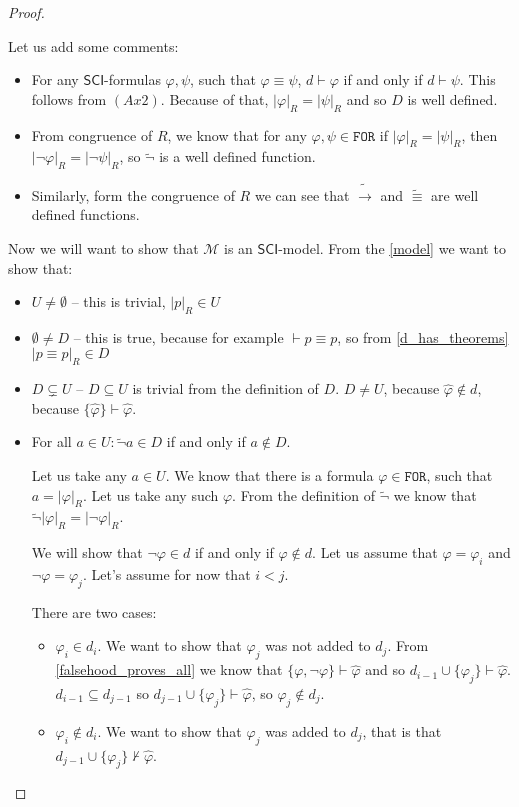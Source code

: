 \documentclass{article}
\theoremstyle{definition}
\theoremstyle{definition}
\theoremstyle{definition}
\theoremstyle{definition}
\theoremstyle{definition}
\newcommand*{\id}{\equiv}
\newcommand*{\ra}{\rightarrow}
\newcommand*{\FOR}{\texttt{FOR}}
\newcommand{\SCI}{$\mathsf{SCI}$\xspace}
\begin{document}
\begin{proof}
\begin{itemize}
    \end{itemize}
    Let us add some comments:
    \begin{itemize}
        \item For any \SCI-formulas $\varphi, \psi$, such that $\varphi \id \psi$, $d \vdash
                  \varphi$ if and only if $d \vdash \psi$. This follows from $(Ax2)$. Because of
              that, $|\varphi|_R = |\psi|_R$ and so $D$ is well defined.
        \item From congruence of $R$, we know that for any $\varphi, \psi \in \FOR$ if
              $|\varphi|_R = |\psi|_R$, then $|\lnot \varphi|_R = |\lnot \psi|_R$, so
              $\tilde{\lnot}$ is a well defined function.
        \item Similarly, form the congruence of $R$ we can see that $\tilde{\ra}$ and
              $\tilde{\id}$ are well defined functions.
    \end{itemize}
    Now we will want to show that $\mathcal{M}$ is an \SCI-model. From the
    \cref{model} we want to show that:
    \begin{itemize}
        \item $U \not = \emptyset$ -- this is trivial, $|p|_R \in U$
        \item $\emptyset \not = D$ -- this is true, because for example $\vdash p \id p$, so from \cref{d_has_theorems} $|p \id p|_R \in D$
        \item $D \subsetneq U$ --  $D \subseteq U$ is trivial from the definition of $D$. $D \not = U$, because $\hat{\varphi} \not \in d$, because $\{\hat{\varphi}\} \vdash \hat{\varphi}$.
        \item For all $a \in U: \tilde{\lnot} a \in D$ if and only if $a \not \in D$.

              Let us take any $a \in U$. We know that there is a formula $\varphi \in \FOR$,
              such that $a = |\varphi|_R$. Let us take any such $\varphi$. From the
              definition of $\tilde{\lnot}$ we know that $\tilde{\lnot}|\varphi|_R = |\lnot
                  \varphi|_R$.

              We will show that $\lnot \varphi \in d$ if and only if $\varphi \not \in d$.
              Let us assume that $\varphi = \varphi_i$ and $\lnot \varphi = \varphi_j$. Let's
              assume for now that $i < j$.

              There are two cases:
              \begin{itemize}
                  \item $\varphi_i \in d_i$. We want to show that $\varphi_j$ was not added to $d_j$. From \cref{falsehood_proves_all} we know that $\{\varphi, \lnot \varphi\} \vdash \hat{\varphi}$ and so $d_{i-1} \cup \{\varphi_j\} \vdash \hat{\varphi}$. $d_{i-1} \subseteq d_{j-1}$ so $d_{j-1} \cup \{\varphi_j\} \vdash \hat{\varphi}$, so $\varphi_j \not \in d_j$.
                  \item $\varphi_i \not \in d_i$. We want to show that $\varphi_j$ was added to $d_j$, that is that $d_{j-1} \cup \{\varphi_j\} \not \vdash \hat{\varphi}$.


\end{itemize}
\end{itemize}
\end{proof}
\end{document}
